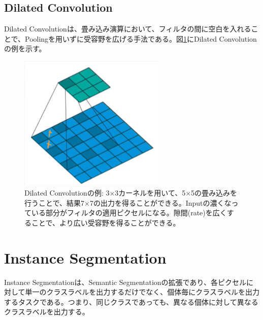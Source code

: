 \documentclass{ltjsarticle}
\begin{document}
\subsection{Dilated Convolution}
Dilated Convolutionは、畳み込み演算において、フィルタの間に空白を入れることで、Poolingを用いずに受容野を広げる手法である。図\ref{fig:Dilated_Convolution}にDilated Convolutionの例を示す。
\begin{figure}[htbp]
  \centering
  \includegraphics[width=7cm]{./capture/Dilated_Convolution.png}
  \caption{Dilated Convolutionの例: 3×3カーネルを用いて、5×5の畳み込みを行うことで、結果7×7の出力を得ることができる。Inputの濃くなっている部分がフィルタの適用ピクセルになる。隙間(rate)を広くすることで、より広い受容野を得ることができる。}
  \label{fig:Dilated_Convolution}
\end{figure}



\clearpage
\section{Instance Segmentation}
Instance Segmentationは、Semantic Segmentationの拡張であり、各ピクセルに対して単一のクラスラベルを出力するだけでなく、個体毎にクラスラベルを出力するタスクである。つまり、同じクラスであっても、異なる個体に対して異なるクラスラベルを出力する。
\end{document}
